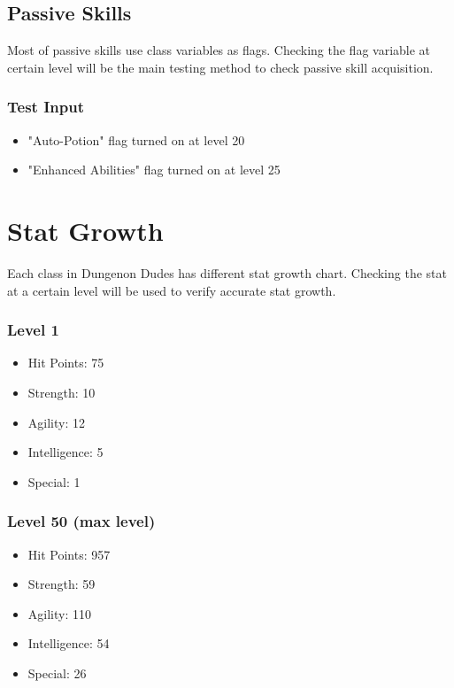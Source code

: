 \documentclass[12pt]{article} %
\begin{document}
\subsection{Passive Skills}
Most of passive skills use class variables as flags. Checking the flag variable at certain level will be the main testing method to check passive skill acquisition.

\subsubsection*{Test Input}

\begin{itemize}
        \item "Auto-Potion" flag turned on at level 20
        \item "Enhanced Abilities" flag turned on at level 25
\end{itemize}

\section{Stat Growth}
Each class in Dungenon Dudes has different stat growth chart. Checking the stat at a certain level will be used to verify accurate stat growth.

\subsubsection*{Level 1}
\begin{itemize}
    \item Hit Points: 75
    \item Strength: 10
    \item Agility: 12
    \item Intelligence: 5
    \item Special: 1
\end{itemize}

\subsubsection*{Level 50 (max level)}
\begin{itemize}
    \item Hit Points: 957
    \item Strength: 59
    \item Agility: 110
    \item Intelligence: 54
    \item Special: 26 
\end{itemize}
\end{document}
